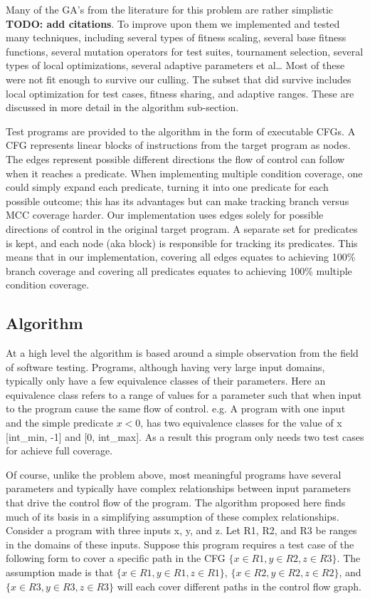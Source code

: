 \documentclass[runningheads]{llncs}
\begin{document}
Many of the GA’s from the literature for this problem are rather simplistic \textbf{TODO: add citations}. To improve upon them we implemented and tested many techniques, including several types of fitness scaling, several base fitness functions, several mutation operators for test suites, tournament selection, several types of local optimizations, several adaptive parameters et al… Most of these were not fit enough to survive our culling. The subset that did survive includes local optimization for test cases, fitness sharing, and adaptive ranges. These are discussed in more detail in the algorithm sub-section.

Test programs are provided to the algorithm in the form of executable CFGs. A CFG represents linear blocks of instructions from the target program as nodes. The edges represent possible different directions the flow of control can follow when it reaches a predicate.  When implementing multiple condition coverage, one could simply expand each predicate, turning it into one predicate for each possible outcome; this has its advantages but can make tracking branch versus MCC coverage harder. Our implementation uses edges solely for possible directions of control in the original target program. A separate set for predicates is kept, and each node (aka block) is responsible for tracking its predicates. This means that in our implementation, covering all edges equates to achieving 100\% branch coverage and covering all predicates equates to achieving 100\% multiple condition coverage. 

\subsection{Algorithm}
At a high level the algorithm is based around a simple observation from the field of software testing. Programs, although having very large input domains, typically only have a few equivalence classes of their parameters. Here an equivalence class refers to a range of values for a parameter such that when input to the program cause the same flow of control. e.g. A program with one input and the simple predicate $ x < 0$, has two equivalence classes for the value of x [int\_min, -1] and [0, int\_max]. As a result this program only needs two test cases for achieve full coverage.

Of course, unlike the problem above, most meaningful programs have several parameters and typically have complex relationships between input parameters that drive the control flow of the program. The algorithm proposed here finds much of its basis in a simplifying assumption of these complex relationships. Consider a program with three inputs x, y, and z. Let R1, R2, and R3 be ranges in the domains of these inputs. Suppose this program requires a test case of the following form to cover a specific path in the CFG $\{ x \in R1, y \in R2, z \in R3 \}$. The assumption made is that $\{ x \in R1, y \in R1, z \in R1 \}$, $\{ x \in R2, y \in R2, z \in R2 \}$, and $\{ x \in R3, y \in R3, z \in R3 \}$ will each cover different paths in the control flow graph. 
\end{document}
